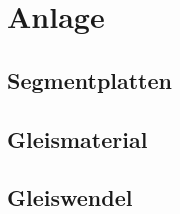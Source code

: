 \section{Anlage}
\label{sec:anlage}

\subsection{Segmentplatten}
\label{sec:segments}


\subsection{Gleismaterial}
\label{sec:trackMaterial}


\subsection{Gleiswendel}
\label{sec:trackHelix}



